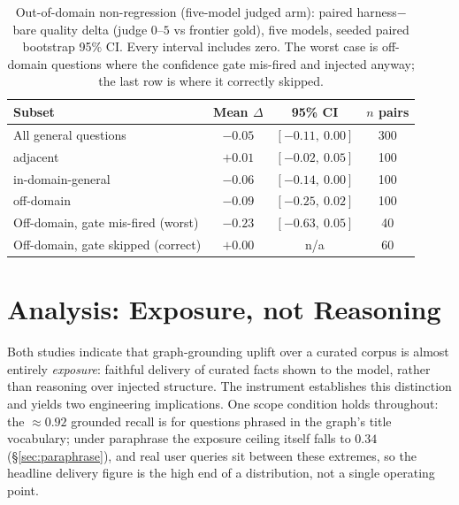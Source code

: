 \documentclass[10pt,twocolumn]{article}
\begin{document}
\begin{table}[t]\centering\small
\caption{Out-of-domain non-regression (five-model judged arm): paired harness$-$bare quality delta (judge
$0$--$5$ vs frontier gold), five models, seeded paired bootstrap 95\% CI. Every interval includes
zero. The worst case is off-domain questions where the confidence gate mis-fired and injected anyway;
the last row is where it correctly skipped.}
\label{tab:ood}
\begin{tabular}{lccc}
\toprule
Subset & Mean $\Delta$ & 95\% CI & $n$ pairs \\
\midrule
All general questions              & $-0.05$ & $[-0.11,\ 0.00]$ & 300 \\
\quad adjacent                     & $+0.01$ & $[-0.02,\ 0.05]$ & 100 \\
\quad in-domain-general            & $-0.06$ & $[-0.14,\ 0.00]$ & 100 \\
\quad off-domain                   & $-0.09$ & $[-0.25,\ 0.02]$ & 100 \\
Off-domain, gate mis-fired (worst) & $-0.23$ & $[-0.63,\ 0.05]$ & 40 \\
Off-domain, gate skipped (correct) & $+0.00$ & n/a              & 60 \\
\bottomrule
\end{tabular}
\end{table}


\section{Analysis: Exposure, not Reasoning}\label{sec:analysis}
Both studies indicate that graph-grounding uplift over a curated corpus is almost entirely \emph{exposure}: faithful delivery of curated facts shown to the model, rather than reasoning over injected structure. The instrument establishes this distinction and yields two engineering implications. One scope condition holds throughout: the $\approx0.92$ grounded recall is for questions phrased in the graph's title vocabulary; under paraphrase the exposure ceiling itself falls to $0.34$ (\S\ref{sec:paraphrase}), and real user queries sit between these extremes, so the headline delivery figure is the high end of a distribution, not a single operating point.
\end{document}
